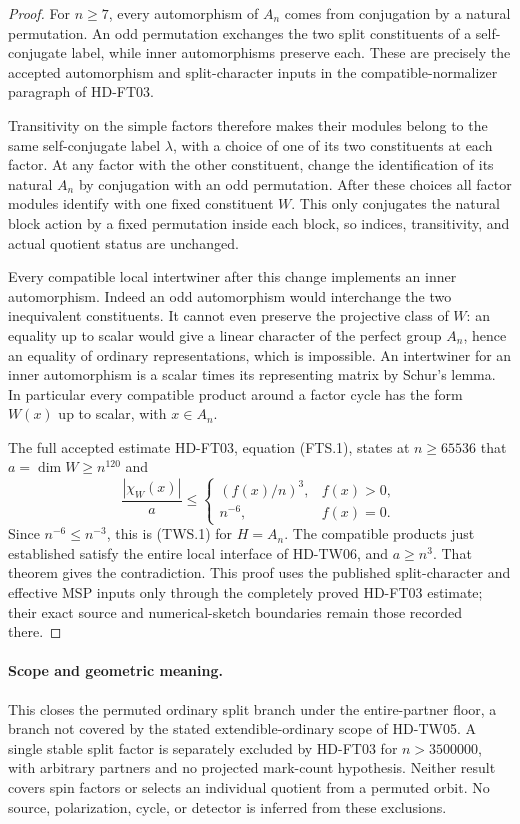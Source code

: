 \begin{proof}
For \(n\ge7\), every automorphism of \(A_n\) comes from
conjugation by a natural permutation. An odd permutation exchanges
the two split constituents of a self-conjugate label, while inner
automorphisms preserve each. These are precisely the accepted
automorphism and split-character inputs in the compatible-normalizer
paragraph of HD-FT03.

Transitivity on the simple factors therefore makes their modules
belong to the same self-conjugate label \(\lambda\), with a choice
of one of its two constituents at each factor. At any factor with
the other constituent, change the identification of its natural
\(A_n\) by conjugation with an odd permutation. After these choices
all factor modules identify with one fixed constituent \(W\).
This only conjugates the natural block action by a fixed permutation
inside each block, so indices, transitivity, and actual quotient
status are unchanged.

Every compatible local intertwiner after this change implements an
inner automorphism. Indeed an odd automorphism would interchange the
two inequivalent constituents. It cannot even preserve the projective
class of \(W\): an equality up to scalar would give a linear
character of the perfect group \(A_n\), hence an equality of ordinary
representations, which is impossible. An intertwiner for an inner
automorphism is a scalar times its representing matrix by Schur's
lemma. In particular every compatible product around a factor cycle
has the form \(W(x)\) up to scalar, with \(x\in A_n\).

The full accepted estimate HD-FT03, equation (FTS.1), states at
\(n\ge65536\) that \(a=\dim W\ge n^{120}\) and
\[
 \frac{|\chi_W(x)|}{a}\le
 \begin{cases}
 (f(x)/n)^3,&f(x)>0,\\
 n^{-6},&f(x)=0.
 \end{cases}
 \tag{TWS.13}
\]
Since \(n^{-6}\le n^{-3}\), this is (TWS.1) for
\(H=A_n\). The compatible products just established satisfy the
entire local interface of HD-TW06, and \(a\ge n^3\).
That theorem gives the contradiction. This proof uses the published
split-character and effective MSP inputs only through the completely
proved HD-FT03 estimate; their exact source and numerical-sketch
boundaries remain those recorded there.
\end{proof}

\paragraph{Scope and geometric meaning.}
This closes the permuted ordinary split branch under the entire-partner
floor, a branch not covered by the stated extendible-ordinary scope of
HD-TW05. A single stable split factor is separately excluded by
HD-FT03 for \(n>3500000\), with arbitrary partners and no projected
mark-count hypothesis. Neither result covers spin factors or selects
an individual quotient from a permuted orbit. No source, polarization,
cycle, or detector is inferred from these exclusions.

